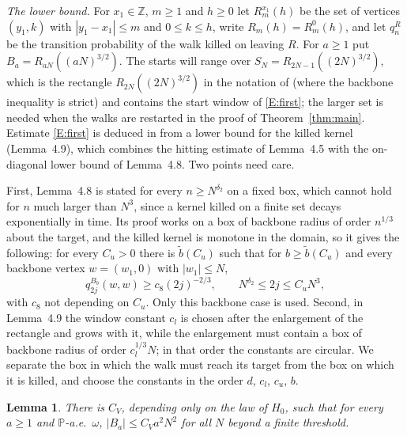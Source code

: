 \documentclass[11pt]{amsart}
\newtheorem{lemma}[theorem]{Lemma}
\theoremstyle{remark}
\numberwithin{equation}{section}
\newcommand{\PP}{\mathbb{P}}
\newcommand{\Z}{\mathbb{Z}}
\begin{document}
\emph{The lower bound.} For $x_1\in\Z$, $m\ge1$ and $h\ge0$ let $R^{x_1}_m(h)$ be the set of vertices $(y_1,k)$ with $|y_1-x_1|\le m$ and $0\le k\le h$, write $R_m(h)=R^0_m(h)$, and let $q^{R}_n$ be the transition probability of the walk killed on leaving $R$. For $a\ge1$ put $B_a=R_{aN}((aN)^{3/2})$. The starts will range over $S_N=R_{2N-1}((2N)^{3/2})$, which is the rectangle $R_{2N}((2N)^{3/2})$ in the notation of \cite{DNNS} (where the backbone inequality is strict) and contains the start window of \ref{E:first}; the larger set is needed when the walks are restarted in the proof of Theorem~\ref{thm:main}. Estimate \ref{E:first} is deduced in \cite{DNNS} from a lower bound for the killed kernel (Lemma~4.9), which combines the hitting estimate of Lemma~4.5 with the on-diagonal lower bound of Lemma~4.8. Two points need care.

First, Lemma~4.8 is stated for every $n\ge N^{\delta_2}$ on a fixed box, which cannot hold for $n$ much larger than $N^3$, since a kernel killed on a finite set decays exponentially in time. Its proof works on a box of backbone radius of order $n^{1/3}$ about the target, and the killed kernel is monotone in the domain, so it gives the following: for every $C_u>0$ there is $\tilde b(C_u)$ such that for $b\ge\tilde b(C_u)$ and every backbone vertex $w=(w_1,0)$ with $|w_1|\le N$,
\begin{equation}\label{eq:L48}
q^{B_b}_{2j}(w,w)\ge c_8(2j)^{-2/3},\qquad N^{\delta_2}\le 2j\le C_uN^3,
\end{equation}
with $c_8$ not depending on $C_u$. Only this backbone case is used. Second, in Lemma~4.9 the window constant $c_l$ is chosen after the enlargement of the rectangle and grows with it, while the enlargement must contain a box of backbone radius of order $c_l^{1/3}N$; in that order the constants are circular. We separate the box in which the walk must reach its target from the box on which it is killed, and choose the constants in the order $d$, $c_l$, $c_u$, $b$.

\begin{lemma}\label{lem:vol}
There is $C_V$, depending only on the law of $H_0$, such that for every $a\ge1$ and $\PP$-a.e.\ $\omega$, $|B_a|\le C_Va^2N^2$ for all $N$ beyond a finite threshold.
\end{lemma}
\end{document}
